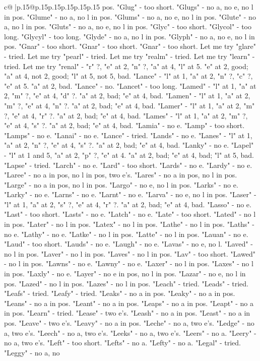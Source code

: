 \documentclass{article}
\begin{document}
{\begin{supertabular}{c@{$\;$}|p{.15\linewidth}@{}p{.15\linewidth}p{.15\linewidth}p{.15\linewidth}p{.15\linewidth}p{.15\linewidth}}
{{{pos. "Glug" {-} too short. "Glugs" {-} no a, no e, no l in pos. "Glume" {-} no a, no l in pos. "Glums" {-} no a, no e, no l in pos. "Glute" {-} no a, no l in pos. "Gluts" {-} no a, no e, no l in pos. "Glyc" {-} too short. "Glycol" {-} too long. "Glycyl" {-} too long. "Glyde" {-} no a, no l in pos. "Glyph" {-} no a, no e, no l in pos. "Gnar" {-} too short. "Gnar" {-} too short. "Gnar" {-} too short. Let me try "glare" {-} tried. Let me try "pearl" {-} tried. Let me try "realm" {-} tried. Let me try "learn" {-} tried. Let me try "renal" {-} "r" ?, "e" at 2, "n" ?, "a" at 4, "l" at 5. "e" at 2, good; "a" at 4, not 2, good; "l" at 5, not 5, bad. "Lance" {-} "l" at 1, "a" at 2, "n" ?, "c" ?, "e" at 5. "a" at 2, bad. "Lance" {-} no. "Lancet" {-} too long. "Lamed" {-} "l" at 1, "a" at 2, "m" ?, "e" at 4, "d" ?. "a" at 2, bad; "e" at 4, bad. "Lamen" {-} "l" at 1, "a" at 2, "m" ?, "e" at 4, "n" ?. "a" at 2, bad; "e" at 4, bad. "Lamer" {-} "l" at 1, "a" at 2, "m" ?, "e" at 4, "r" ?. "a" at 2, bad; "e" at 4, bad. "Lames" {-} "l" at 1, "a" at 2, "m" ?, "e" at 4, "s" ?. "a" at 2, bad; "e" at 4, bad. "Lamia" {-} no e. "Lamp" {-} too short. "Lamps" {-} no e. "Lanai" {-} no e. "Lance" {-} tried. "Lands" {-} no e. "Lanes" {-} "l" at 1, "a" at 2, "n" ?, "e" at 4, "s" ?. "a" at 2, bad; "e" at 4, bad. "Lanky" {-} no e. "Lapel" {-} "l" at 1 and 5, "a" at 2, "p" ?, "e" at 4. "a" at 2, bad; "e" at 4, bad; "l" at 5, bad. "Lapse" {-} tried. "Larch" {-} no e. "Lard" {-} too short. "Lards" {-} no e. "Lardy" {-} no e. "Laree" {-} no a in pos, no l in pos, two e's. "Lares" {-} no a in pos, no l in pos. "Large" {-} no a in pos, no l in pos. "Largo" {-} no e, no l in pos. "Larks" {-} no e. "Larky" {-} no e. "Larns" {-} no e. "Larnt" {-} no e. "Larva" {-} no e, no l in pos. "Laser" {-} "l" at 1, "a" at 2, "s" ?, "e" at 4, "r" ?. "a" at 2, bad; "e" at 4, bad. "Lasso" {-} no e. "Last" {-} too short. "Lasts" {-} no e. "Latch" {-} no e. "Late" {-} too short. "Lated" {-} no l in pos. "Later" {-} no l in pos. "Latex" {-} no l in pos. "Lathe" {-} no l in pos. "Laths" {-} no e. "Lathy" {-} no e. "Latke" {-} no l in pos. "Latte" {-} no l in pos. "Lauan" {-} no e. "Laud" {-} too short. "Lauds" {-} no e. "Laugh" {-} no e. "Lavas" {-} no e, no l. "Laved" {-} no l in pos. "Laver" {-} no l in pos. "Laves" {-} no l in pos. "Lav" {-} too short. "Lawed" {-} no l in pos. "Lawns" {-} no e. "Lawny" {-} no e. "Laxer" {-} no l in pos. "Laxes" {-} no l in pos. "Laxly" {-} no e. "Layer" {-} no e in pos, no l in pos. "Lazar" {-} no e, no l in pos. "Lazed" {-} no l in pos. "Lazes" {-} no l in pos. "Leach" {-} tried. "Leads" {-} tried. "Leafs" {-} tried. "Leafy" {-} tried. "Leaks" {-} no a in pos. "Leaky" {-} no a in pos. "Leans" {-} no a in pos. "Leant" {-} no a in pos. "Leaps" {-} no a in pos. "Leapt" {-} no a in pos. "Learn" {-} tried. "Lease" {-} two e's. "Leash" {-} no a in pos. "Least" {-} no a in pos. "Leave" {-} two e's. "Leavy" {-} no a in pos. "Leche" {-} no a, two e's. "Ledge" {-} no a, two e's. "Leech" {-} no a, two e's. "Leeks" {-} no a, two e's. "Leers" {-} no a. "Leery" {-} no a, two e's. "Left" {-} too short. "Lefts" {-} no a. "Lefty" {-} no a. "Legal" {-} tried. "Leggy" {-} no a, no }}}
\end{supertabular}}
\end{document}
